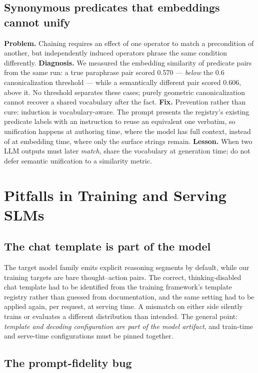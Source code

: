 \subsection{Synonymous predicates that embeddings cannot unify}

\textbf{Problem.} Chaining requires an effect of one operator to match a
precondition of another, but independently induced operators phrase the same
condition differently.
\textbf{Diagnosis.} We measured the embedding similarity of predicate pairs
from the same run: a true paraphrase pair scored 0.570 --- \emph{below} the
0.6 canonicalization threshold --- while a semantically different pair scored
0.606, above it. No threshold separates these cases; purely geometric
canonicalization cannot recover a shared vocabulary after the fact.
\textbf{Fix.} Prevention rather than cure: induction is vocabulary-aware.
The prompt presents the registry's existing predicate labels with an
instruction to reuse an equivalent one verbatim, so unification happens at
authoring time, where the model has full context, instead of at embedding
time, where only the surface strings remain.
\textbf{Lesson.} When two LLM outputs must later \emph{match}, share the
vocabulary at generation time; do not defer semantic unification to a
similarity metric.

\section{Pitfalls in Training and Serving SLMs}
\label{sec:disc-slm}

\subsection{The chat template is part of the model}

The target model family emits explicit reasoning segments by default, while
our training targets are bare thought--action pairs. The correct,
thinking-disabled chat template had to be identified from the training
framework's template registry rather than guessed from documentation, and the
same setting had to be applied again, per request, at serving time. A
mismatch on either side silently trains or evaluates a different
distribution than intended. The general point: \emph{template and decoding
configuration are part of the model artifact}, and train-time and
serve-time configurations must be pinned together.

\subsection{The prompt-fidelity bug}


